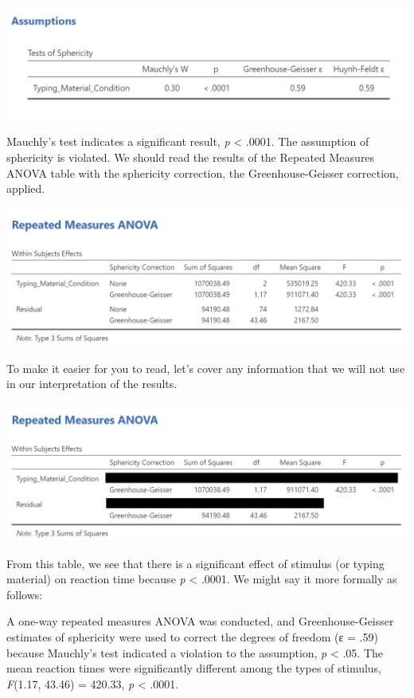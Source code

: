 \documentclass[
]{book}
\begin{document}
\includegraphics{img/RM_ANOVA_MauchlysTestResults.png}

Mauchly's test indicates a significant result, \emph{p} \textless{} .0001. The assumption of sphericity is violated. We should read the results of the Repeated Measures ANOVA table with the sphericity correction, the Greenhouse-Geisser correction, applied.

\includegraphics{img/RM_ANOVA_Results.png}

To make it easier for you to read, let's cover any information that we will not use in our interpretation of the results.

\includegraphics{img/RM_ANOVA_Results_Simplified.png}

From this table, we see that there is a significant effect of stimulus (or typing material) on reaction time because \emph{p} \textless{} .0001. We might say it more formally as follows:

A one-way repeated measures ANOVA was conducted, and Greenhouse-Geisser estimates of sphericity were used to correct the degrees of freedom (ε = .59) because Mauchly's test indicated a violation to the assumption, \emph{p} \textless{} .05. The mean reaction times were significantly different among the types of stimulus, \emph{F}(1.17, 43.46) = 420.33, \emph{p} \textless{} .0001.
\end{document}
